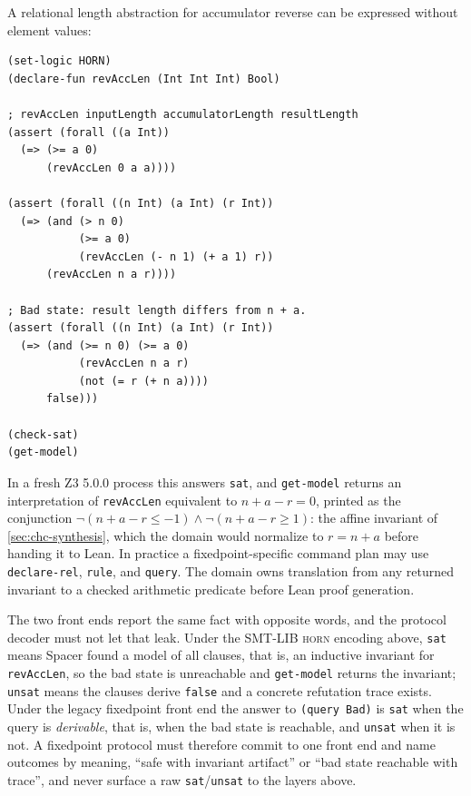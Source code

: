 \documentclass[11pt,oneside]{report}
\newcommand{\code}[1]{\texttt{#1}}
\begin{document}
A relational length abstraction for accumulator reverse can be expressed without element values:

\begin{lstlisting}[language=SMTLIB,caption={Schematic CHC relation for accumulator reverse lengths.},label={lst:smt-chc}]
(set-logic HORN)
(declare-fun revAccLen (Int Int Int) Bool)

; revAccLen inputLength accumulatorLength resultLength
(assert (forall ((a Int))
  (=> (>= a 0)
      (revAccLen 0 a a))))

(assert (forall ((n Int) (a Int) (r Int))
  (=> (and (> n 0)
           (>= a 0)
           (revAccLen (- n 1) (+ a 1) r))
      (revAccLen n a r))))

; Bad state: result length differs from n + a.
(assert (forall ((n Int) (a Int) (r Int))
  (=> (and (>= n 0) (>= a 0)
           (revAccLen n a r)
           (not (= r (+ n a))))
      false)))

(check-sat)
(get-model)
\end{lstlisting}

In a fresh Z3 5.0.0 process this answers \texttt{sat}, and \code{get-model} returns an interpretation of \code{revAccLen} equivalent to $n + a - r = 0$, printed as the conjunction $\neg(n+a-r\le -1)\land\neg(n+a-r\ge 1)$: the affine invariant of \cref{sec:chc-synthesis}, which the domain would normalize to $r = n + a$ before handing it to Lean. In practice a fixedpoint-specific command plan may use \code{declare-rel}, \code{rule}, and \code{query}. The domain owns translation from any returned invariant to a checked arithmetic predicate before Lean proof generation.

The two front ends report the same fact with opposite words, and the protocol decoder must not let that leak. Under the SMT-LIB \textsc{horn} encoding above, \texttt{sat} means Spacer found a model of all clauses, that is, an inductive invariant for \code{revAccLen}, so the bad state is unreachable and \code{get-model} returns the invariant; \texttt{unsat} means the clauses derive \texttt{false} and a concrete refutation trace exists. Under the legacy fixedpoint front end the answer to \code{(query Bad)} is \texttt{sat} when the query is \emph{derivable}, that is, when the bad state is reachable, and \texttt{unsat} when it is not. A fixedpoint protocol must therefore commit to one front end and name outcomes by meaning, ``safe with invariant artifact'' or ``bad state reachable with trace'', and never surface a raw \texttt{sat}/\texttt{unsat} to the layers above.
\end{document}
